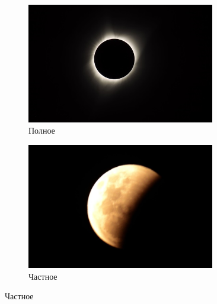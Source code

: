 \documentclass{article}
\begin{document}
    \begin{figure}
    	\centering
    	\begin{subfigure}[b]{0.45\textwidth}
    		\includegraphics[width = 0.9\textwidth]{img/FullEclipse}
    		\caption{Полное}
    	\end{subfigure}
    	\begin{subfigure}[b]{0.45\textwidth}
    		\includegraphics[width = 0.9\textwidth]{img/PartialEclipse}
    		\caption{Частное}
    	\end{subfigure}
    	

\end{figure}
\end{document}
